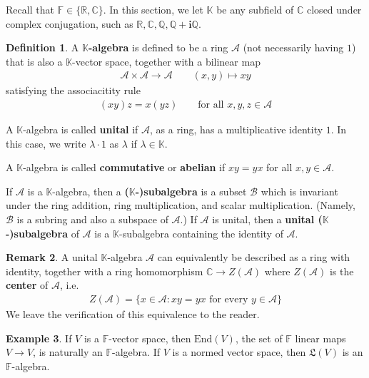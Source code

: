 \documentclass[12pt,b5paper,notitlepage]{article}
\theoremstyle{definition}
\newtheorem{df}{Definition}[section]
\newtheorem{eg}[df]{Example}
\newtheorem{rem}[df]{Remark}
\theoremstyle{plain}
\newcommand{\fk}{\mathfrak}
\newcommand{\End}{\mathrm{End}} %
\newcommand{\scr}{\mathscr}
\newcommand{\im}{\mathbf{i}}
\newcommand{\Kbb}{\mathbb K}
\newcommand{\Cbb}{\mathbb C}
\newcommand{\Qbb}{\mathbb Q}
\newcommand{\Rbb}{\mathbb R}
\newcommand{\Fbb}{\mathbb F}
\numberwithin{equation}{section}
\begin{document}
Recall that $\Fbb\in\{\Rbb,\Cbb\}$. In this section, we let $\Kbb$ be any subfield of $\Cbb$ closed under complex conjugation, such as $\Rbb,\Cbb,\Qbb,\Qbb+\im\Qbb$.


\begin{df}
A \textbf{$\Kbb$-algebra}   is defined to be a ring $\scr A$ (not necessarily having $1$) that is also a $\Kbb$-vector space, together with a bilinear map
\begin{align*}
\scr A\times\scr A\rightarrow\scr A\qquad (x,y)\mapsto xy
\end{align*}
satisfying the associacitity rule
\begin{align*}
(xy)z=x(yz)\qquad\text{for all }x,y,z\in \scr A
\end{align*}

A $\Kbb$-algebra is called \textbf{unital}  if $\scr A$, as a ring, has a multiplicative identity $1$. In this case, we write $\lambda\cdot 1$ as $\lambda$ if $\lambda\in\Kbb$. 

A $\Kbb$-algebra is called \textbf{commutative} or \textbf{abelian}   if $xy=yx$ for all $x,y\in\scr A$.

If $\scr A$ is a $\Kbb$-algebra, then a \textbf{($\Kbb$-)subalgebra}  is a subset $\scr B$ which is invariant under the ring addition, ring multiplication, and scalar multiplication. (Namely, $\scr B$ is a subring and also a subspace of $\scr A$.) If $\scr A$ is unital, then a \textbf{unital ($\Kbb$-)subalgebra} of $\scr A$ is a $\Kbb$-subalgebra containing the identity of $\scr A$.  \hfill\qedsymbol
\end{df}


\begin{rem}
A unital $\Kbb$-algebra $\scr A$ can equivalently be described as a ring with identity, together with a ring homomorphism $\Cbb\rightarrow Z(\scr A)$ where $Z(\scr A)$ is the \textbf{center} of $\scr A$, i.e.
\begin{align*}
Z(\scr A)=\{x\in\scr A:xy=yx\text{ for every }y\in\scr A\}
\end{align*}
We leave the verification of this equivalence to the reader.
\end{rem}



\begin{eg}
If $V$ is a $\Fbb$-vector space, then $\End(V)$, the set of $\Fbb$ linear maps $V\rightarrow V$, is naturally an $\Fbb$-algebra. If $V$ is a normed vector space, then $\fk L(V)$ is an $\Fbb$-algebra.
\end{eg}
\end{document}
